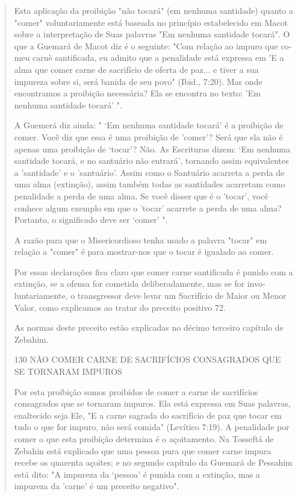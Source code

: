 \begin{quote}
Esta aplicação da proibição "não tocará" (em nenhuma santidade) quanto a
"comer" voluntariamente está baseada no princípio estabelecido em Macot
sobre a interpretação de Suas palavras "Em nenhuma santidade tocará". O
que a Guemará de Macot diz é o seguinte: "Com relação ao impuro que
co­meu carnè santificada, eu admito que a penalidade está expressa em 'E
a alma que comer carne de sacrifício de oferta de paz... e tiver a sua
impureza sobre si, será banida de seu povo" (Ibid., 7:20). Mas onde
encontramos a proibição necessária? Ela se encontra no texto: 'Em
nenhuma santidade tocará' ".

A Guemerá diz ainda: " `Em nenhuma santidade tocará' é a proibi­ção de
comer. Você diz que essa é uma proibição de 'comer'? Será que ela não é
apenas uma proibição de `tocar'? Não. As Escrituras dizem: `Em nenhuma
san­tidade tocará, e no santuário não entrará', tornando assim
equivalentes a 'santi­dade' e o 'santuário'. Assim como o Santuário
acarreta a perda de uma alma (extinção), assim também todas as
santidades acarretam como penalidade a perda de uma alma. Se você disser
que é o 'tocar', você conhece algum exemplo em que o 'tocar' acarrete a
perda de uma alma? Portanto, o significado deve ser `comer' ".

A razão para que o Misericordioso tenha usado a palavra "tocar" em
relação a "comer" é para mostrar-nos que o tocar é igualado ao comer.

Por essas declarações fica claro que comer carne santificada é puni­do
com a extinção, se a ofensa for cometida deliberadamente, mas se for
invo­luntariamente, o transgressor deve levar um Sacrifício de Maior ou
Menor Va­lor, como explicamos ao tratar do preceito positivo 72.

As normas deste preceito estão explicadas no décimo terceiro capí­tulo
de Zebahim.

130 NÃO COMER CARNE DE SACRIFÍCIOS CONSAGRADOS QUE SE TORNARAM IMPUROS

Por esta proibição somos proibidos de comer a carne de sacrifícios
consagrados que se tornaram impuros. Ela está expressa em Suas palavras,
enal­tecido seja Ele, "E a carne sagrada do sacrifício de paz que tocar
em tudo o que for impuro, não será comida" (Levítico 7:19). A penalidade
por comer o que esta proibição determina é o açoitamento. Na Tosseftá de
Zebahin está ex­plicado que uma pessoa pura que comer carne impura
recebe os quarenta açoites; 
e no segundo capítulo da Guemará de Pessahim está dito: "A impureza
da `pessoa' é punida com a extinção, mas a impureza da 'carne' é um
preceito negativo".


\end{quote}
